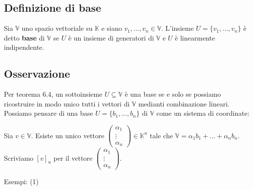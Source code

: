 \documentclass[12pt]{article}
\begin{document}
\subsection{Definizione di base}

Sia $\mathbb{V}$ uno spazio vettoriale su $\mathbb{K}$ e siano $v_1, \dots, v_n \in \mathbb{V}$. L'insieme $U = \{v_1, \dots, v_n\}$ è detto \textbf{base} di $\mathbb{V}$ se $U$ è un insieme di generatori di $\mathbb{V}$ e $U$ è linearmente indipendente.

\subsection{Osservazione}

Per teorema 6.4, un sottoinsieme $U \subseteq \mathbb{V}$ è una base se e solo se possiamo ricostruire in modo unico tutti i vettori di $\mathbb{V}$ medianti combinazione lineari. Possiamo pensare di una base $U = \{b_1, \dots, b_n\}$ di $\mathbb{V}$ come un sistema di coordinate:

\begin{center}
    Sia $v \in \mathbb{V}$. Esiste un unico vettore $\begin{pmatrix}
        \alpha_1\\
        \vdots\\
        \alpha_n
    \end{pmatrix} \in \mathbb{K}^n$ tale che $\mathbb{V} = \alpha_1b_1 + \dots + \alpha_nb_n$.\\
    Scriviamo $[v]_u$ per il vettore $\begin{pmatrix}
        \alpha_1\\
        \vdots\\
        \alpha_n
    \end{pmatrix}$.
\end{center}
Esempi: (1)
\end{document}
